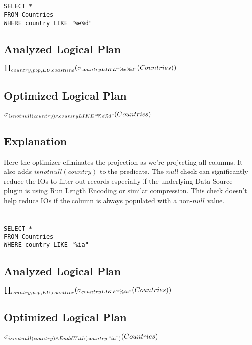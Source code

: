 \documentclass[12pt]{article}
\begin{document}
\newpage

\section{}
\begin{verbatim}
SELECT *
FROM Countries
WHERE country LIKE "%e%d"
\end{verbatim}

\subsection*{Analyzed Logical Plan}
$\prod_{country, pop, EU, coastline}(\sigma_{country LIKE ``\%e\%d"}(Countries))$

\subsection*{Optimized Logical Plan}
$\sigma_{isnotnull(country) \wedge country LIKE ``\%e\%d"}(Countries)$

\subsection*{Explanation}

Here the optimizer eliminates the projection as we're projecting all columns. It also adds $isnotnull(country)$ to the predicate. The $null$ check can significantly reduce the IOs to filter out records especially if the underlying Data Source plugin is using Run Length Encoding or similar compression. This check doesn't help reduce IOs if the column is always populated with a non-$null$ value.

\newpage

\section{}
\begin{verbatim}
SELECT *
FROM Countries
WHERE country LIKE "%ia"
\end{verbatim}

\subsection*{Analyzed Logical Plan}
$\prod_{country, pop, EU, coastline}(\sigma_{country LIKE ``\%ia"}(Countries))$


\subsection*{Optimized Logical Plan}
$\sigma_{isnotnull(country) \wedge EndsWith(country, ``ia")}(Countries)$
\end{document}
